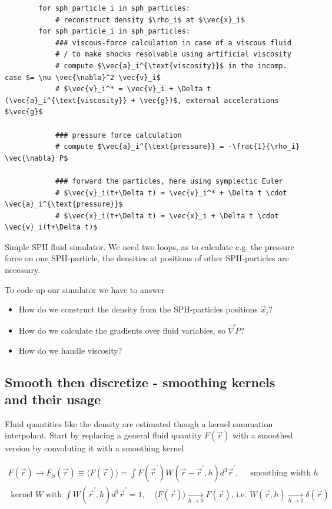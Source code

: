 \begin{codebox}
    \begin{verbatim}
        for sph_particle_i in sph_particles:
            # reconstruct density $\rho_i$ at $\vec{x}_i$
        for sph_particle_i in sph_particles:
            ### viscous-force calculation in case of a viscous fluid
            # / to make shocks resolvable using artificial viscosity
            # compute $\vec{a}_i^{\text{viscosity}}$ in the incomp. case $= \nu \vec{\nabla}^2 \vec{v}_i$
            # $\vec{v}_i^* = \vec{v}_i + \Delta t (\vec{a}_i^{\text{viscosity}} + \vec{g})$, external accelerations $\vec{g}$

            ### pressure force calculation
            # compute $\vec{a}_i^{\text{pressure}} = -\frac{1}{\rho_i} \vec{\nabla} P$

            ### forward the particles, here using symplectic Euler
            # $\vec{v}_i(t+\Delta t) = \vec{v}_i^* + \Delta t \cdot \vec{a}_i^{\text{pressure}}$
            # $\vec{x}_i(t+\Delta t) = \vec{x}_i + \Delta t \cdot \vec{v}_i(t+\Delta t)$
    \end{verbatim}
    \caption{Simple SPH fluid simulator. We need two loops, as to calculate e.g. the pressure force on one SPH-particle, the densities at positions of other SPH-particles are necessary.}
    \label{code:sph}
\end{codebox}

To code up our simulator we have to answer
\begin{itemize}
    \item How do we construct the density from the SPH-particles positions $\vec{x}_i$?
    \item How do we calculate the gradients over fluid variables, so $\vec{\nabla}P$?
    \item How do we handle viscosity?
\end{itemize}

\subsection{Smooth then discretize - smoothing kernels and their usage}
Fluid quantities like the density are estimated though a kernel summation interpolant.
Start by replacing a general fluid quantity $F(\vec{r})$ with a smoothed version
by convoluting it with a smoothing kernel

\begin{equation}
    \begin{gathered}
        F(\vec{r}) \rightarrow F_S(\vec{r}) \equiv\langle F(\vec{r})\rangle=\int F\left(\vec{r}^{\prime}\right) W\left(\vec{r}-\vec{r}^{\prime}, h\right) d^3 \vec{r}^{\prime}, \quad \text { smoothing width } h \\
        \text { kernel } W \text { with } \int W\left(\vec{r}^{\prime}, h\right) d^3 \vec{r}^{\prime}=1, \quad\langle F(\vec{r})\rangle \underset{h \rightarrow 0}{\longrightarrow} F(\vec{r}) \text {, i.e. } W(\vec{r}, h) \underset{h \rightarrow 0}{\longrightarrow} \delta(\vec{r})
    \end{gathered}
\end{equation}

